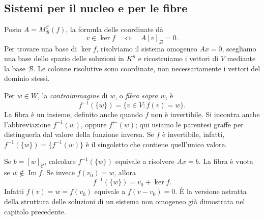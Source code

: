\subsection{Sistemi per il nucleo e per le fibre}
Posto $A=M_{\mathcal B}^{\mathcal C}(f)$, la formula delle coordinate dà
\[
 v\in\ker f\quad\Longleftrightarrow\quad A[v]_{\mathcal B}=0.
\]
Per trovare una base di $\ker f$, risolviamo il sistema omogeneo $Ax=0$, scegliamo una base dello spazio delle soluzioni in $K^n$ e ricostruiamo i vettori di $V$ mediante la base $\mathcal B$. Le colonne risolutive sono coordinate, non necessariamente i vettori del dominio stessi.

\begin{definizione}
Per $w\in W$, la \emph{controimmagine} di $w$, o \emph{fibra sopra $w$}, è
\[
 f^{-1}(\{w\})=\{v\in V:f(v)=w\}.
\]
La fibra è un insieme, definito anche quando $f$ non è invertibile. Si incontra anche l’abbreviazione $f^{-1}(w)$, oppure $f^{\leftarrow}(w)$; qui usiamo le parentesi graffe per distinguerla dal valore della funzione inversa. Se $f$ è invertibile, infatti, $f^{-1}(\{w\})=\{f^{-1}(w)\}$ è il singoletto che contiene quell’unico valore.
\end{definizione}
Se $b=[w]_{\mathcal C}$, calcolare $f^{-1}(\{w\})$ equivale a risolvere $Ax=b$. La fibra è vuota se $w\notin\operatorname{Im}f$. Se invece $f(v_0)=w$, allora
\[
 f^{-1}(\{w\})=v_0+\ker f.
\]
Infatti $f(v)=w=f(v_0)$ equivale a $f(v-v_0)=0$. È la versione astratta della struttura delle soluzioni di un sistema non omogeneo già dimostrata nel capitolo precedente.

